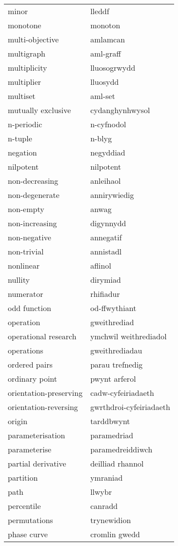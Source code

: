 \begin{supertabular}{p{0.22\textwidth}p{0.22\textwidth}}
minor & lleddf \\
monotone & monoton \\
multi-objective & amlamcan \\
multigraph & aml-graff \\
multiplicity & lluosogrwydd \\
multiplier & lluosydd \\
multiset & aml-set \\
mutually exclusive & cydanghynhwysol \\
n-periodic & n-cyfnodol \\
n-tuple & n-blyg \\
negation & negyddiad \\
nilpotent & nilpotent \\
non-decreasing & anleihaol \\
non-degenerate & annirywiedig \\
non-empty & anwag \\
non-increasing & digynnydd \\
non-negative & annegatif \\
non-trivial & annistadl \\
nonlinear & aflinol \\
nullity & dirymiad \\
numerator & rhifiadur \\
odd function & od-ffwythiant \\
operation & gweithrediad \\
operational research & ymchwil weithrediadol \\
operations & gweithrediadau \\
ordered pairs & parau trefnedig \\
ordinary point & pwynt arferol \\
orientation-preserving & cadw-cyfeiriadaeth \\
orientation-reversing & gwrthdroi-cyfeiriadaeth \\
origin & tarddbwynt \\
parameterisation & paramedriad \\
parameterise & paramedreiddiwch \\
partial derivative & deilliad rhannol \\
partition & ymraniad \\
path & llwybr \\
percentile & canradd \\
permutations & trynewidion \\
phase curve & cromlin gwedd \\

\end{supertabular}
